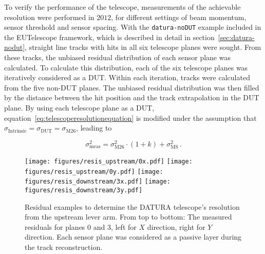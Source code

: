 To verify the performance of the \Datura telescope, measurements of the
achievable resolution were performed in $2012$, for different settings of beam
momentum, sensor threshold and sensor spacing. With the \texttt{datura-noDUT}
example included in the {EUTelescope} framework, which is described in detail in
section~\ref{sec:datura-nodut}, straight line tracks with hits in all six
telescope planes were sought. From these tracks, the unbiased residual
distribution of each sensor plane was calculated. To calculate this
distribution, each of the six telescope planes was iteratively considered as a
DUT. Within each iteration, tracks were calculated from the five non-DUT planes.
The unbiased residual distribution was then filled by the distance between the
hit position and the track extrapolation in the DUT plane. By using each
telescope plane as a DUT, equation~\ref{eq:telescoperesolutionequation} is
modified under the assumption that $\sigma_{\textrm{Intrinsic}} =
\sigma_{\textrm{DUT}} = \sigma_{\textrm{M26}}$, leading to

\begin{equation}
\label{eq:telescoperesolutionequation_2}
\sigma_{\textrm{meas}}^2 = \sigma_{\textrm{M26}}^2 \cdot \left( 1 + k \right) +
\sigma_{\textrm{MS}}^2\,.
\end{equation}

\begin{figure}[tb]
\centering
\texttt{[image: figures/resis\_upstream/0x.pdf]}
\texttt{[image: figures/resis\_upstream/0y.pdf]}
\texttt{[image: figures/resis\_downstream/3x.pdf]}
\texttt{[image: figures/resis\_downstream/3y.pdf]}
\caption[Residual examples to determine the DATURA telescope's
resolution. Upstream lever arm]{Residual examples to determine the DATURA
telescope's resolution from the upstream lever arm. From top to bottom: The
measured residuals for planes $0$ and $3$, left for $X$
direction, right for $Y$ direction. Each sensor plane was considered as a
passive layer during the track reconstruction.}
\label{fig:residualexample1}
\end{figure}

